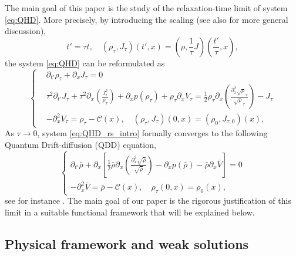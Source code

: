 \documentclass[leqno]{amsart}
\theoremstyle{plain}
\theoremstyle{definition}
\theoremstyle{remark}
\theoremstyle{plain}
\theoremstyle{plain}
\def\d{{\partial}}
\numberwithin{equation}{section}
\begin{document}
The main goal of this paper is the study of the relaxation-time limit of system \eqref{eq:QHD}. More precisely, by introducing the scaling \cite{MN} (see also \cite{DM, MMS} for more general discussion),
\begin{equation}\label{eq:rs_intro}
t'=\tau t,\quad (\rho_\tau,J_\tau)(t',x)=\left(\rho,\frac{1}{\tau}J\right)\left(\frac{t'}{\tau},x\right),
\end{equation}
the system \eqref{eq:QHD} can be reformulated as
\begin{equation}\label{eq:QHD_rs_intro}
\left\{\begin{aligned}
&\d_{t'}\rho_\tau+\d_x J_\tau=0\\
&\tau^2\d_{t'} J_\tau+\tau^2\d_x\left(\frac{J_\tau^2}{\rho_\tau}\right)+\d_x p(\rho_\tau)+\rho_\tau\d_xV_\tau=\frac{1}{2}\rho_\tau\d_x\left(\frac{\d_x^2\sqrt\rho_\tau}{\sqrt\rho_\tau}\right)-J_\tau\\
&-\d_x^2 V_\tau=\rho_\tau-\mathcal{C}(x),\quad (\rho_\tau,J_\tau)(0,x)=(\rho_0,J_{\tau,0})(x),
\end{aligned}\right.
\end{equation}
As $\tau\to 0$, system \eqref{eq:QHD_rs_intro} formally converges to the following Quantum Drift-diffusion (QDD) equation, 
\begin{equation}\label{eq:qdde}
\begin{cases}
\d_{t'}\bar\rho+\d_x\left[\frac{1}{2}\bar\rho\d_x\left(\frac{\d_x^2\sqrt{\bar\rho}}{\sqrt{\bar\rho}}\right)-\d_x p(\bar\rho)-\bar\rho\d_x\bar{V}\right]=0\\
-\d_x^2\bar V=\bar\rho-\mathcal{C}(x),\quad \rho_\tau(0,x)=\rho_0(x),
\end{cases}
\end{equation}
see for instance \cite{J, R}.
\newline
The main goal of our paper is the rigorous justification of this limit in a suitable functional framework that will be explained below.

\subsection{Physical framework and weak solutions}
\end{document}
